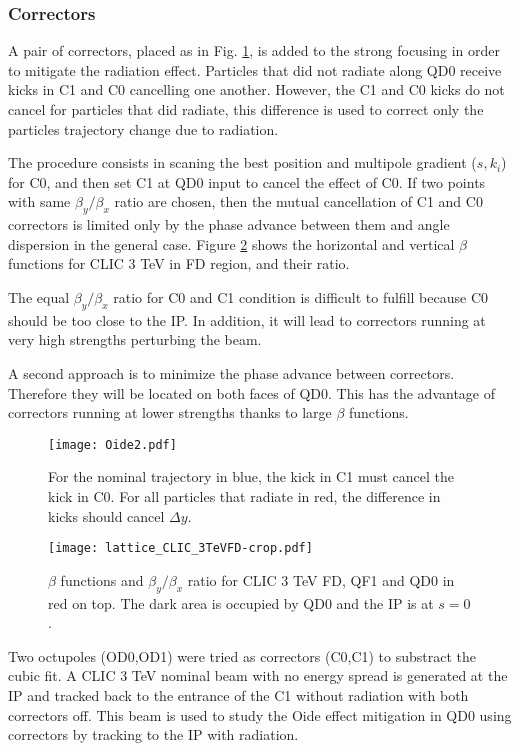 \subsubsection{Correctors}
A pair of correctors, placed as in Fig. \ref{f:corrector}, is added to the strong focusing in order to mitigate the radiation effect. Particles that did not radiate along QD0 receive kicks in C1 and C0 cancelling one another. However, the C1 and C0 kicks do not cancel for particles that did radiate, this difference is used to correct only the particles trajectory change due to radiation.\par
The procedure consists in scaning the best position and multipole gradient ($s,k_i$) for C0, and then set C1 at QD0 input to cancel the effect of C0. If two points with same $\beta_y/\beta_x$ ratio are chosen, then the mutual cancellation of C1 and C0 correctors is limited only by the phase advance between them \cite{PhysRevSTAB.8.104002} and angle dispersion in the general case. Figure \ref{f:betaratio} shows the horizontal and vertical $\beta$ functions for CLIC 3 TeV in FD region, and their ratio.\par
The equal $\beta_y/\beta_x$ ratio for C0 and C1 condition is difficult to fulfill because C0 should be too close to the IP. In addition, it will lead to correctors running at very high strengths perturbing the beam.\par
A second approach is to minimize the phase advance between correctors. Therefore they will be located on both faces of QD0. This has the advantage of correctors running at lower strengths thanks to large $\beta$ functions.\par
\begin{figure}[!htb]
\centering
\texttt{[image: Oide2.pdf]}\caption{For the nominal trajectory in blue, the kick in C1 must cancel the kick in C0. For all particles that radiate in red, the difference in kicks should cancel $\Delta y$.}\label{f:corrector}
\end{figure}
\begin{figure}[!htb]
\centering
\texttt{[image: lattice\_CLIC\_3TeVFD-crop.pdf]}\caption{$\beta$ functions and $\beta_y/\beta_x$ ratio for CLIC 3 TeV FD, QF1 and QD0 in red on top. The dark area is occupied by QD0 and the IP is at $s=0$.}\label{f:betaratio}
\end{figure}
Two octupoles (OD0,OD1) were tried as correctors (C0,C1) to substract the cubic fit. A CLIC 3 TeV nominal beam with no energy spread is generated at the IP and tracked back to the entrance of the C1 without radiation with both correctors off. This beam is used to study the Oide effect mitigation in QD0 using correctors by tracking to the IP with radiation.\par
